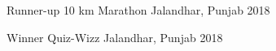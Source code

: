 



\begin{cvhonors}

  \cvhonor
    {Runner-up} %
    {10 km Marathon} %
    {Jalandhar, Punjab} %
    {2018} %

  \cvhonor
    {Winner} %
    { Quiz-Wizz } %
    {Jalandhar, Punjab} %
    {2018} %



\end{cvhonors}

